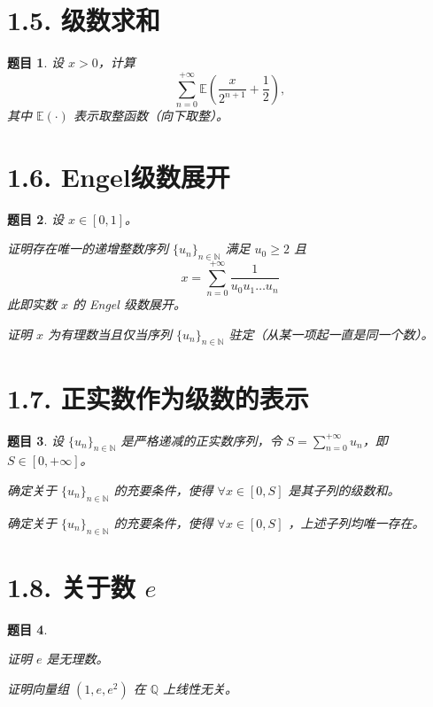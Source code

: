 \documentclass[12pt,UTF8]{ctexbook}
\theoremstyle{exercisestyle}
\newtheorem*{exercise}{题目}
\theoremstyle{solutionstyle}
\begin{document}
\section{1.5. 级数求和}\label{calcul-dune-somme}
\begin{exercise}
设 $x > 0$，计算  
$$
\sum_{n=0}^{+\infty} \mathbb{E}\left(\frac{x}{2^{n+1}} + \frac{1}{2}\right),
$$  
其中 $\mathbb{E}(\cdot)$ 表示取整函数（向下取整）。
\end{exercise}

\section{1.6. Engel级数展开}
\begin{exercise}
设 $x \in [0,1]$。  
\begin{subquestions}
  \item 证明存在唯一的递增整数序列 $\{u_n\}_{n\in\mathbb{N}}$ 满足 $u_0 \geqslant 2$ 且  
  $$
  x = \sum_{n=0}^{+\infty} \frac{1}{u_0 u_1 \dots u_n}
  $$
  此即实数 $x$ 的 Engel 级数展开。  
  \item 证明 $x$ 为有理数当且仅当序列 $\{u_n\}_{n\in\mathbb{N}}$ 驻定（从某一项起一直是同一个数）。
\end{subquestions}
\end{exercise}

\section{1.7. 正实数作为级数的表示}
\begin{exercise}
设 $\{u_n\}_{n\in\mathbb{N}}$ 是严格递减的正实数序列，令 $\displaystyle S = \sum_{n=0}^{+\infty} u_n$，即 $S \in [0, +\infty]$。

\begin{subquestions}
\item 确定关于 $\{u_n\}_{n\in\mathbb{N}}$ 的充要条件，使得 $\forall x \in [0, S]$ 是其子列的级数和。
\item 确定关于 $\{u_n\}_{n\in\mathbb{N}}$ 的充要条件，使得 $\forall x \in [0, S]$ ，上述子列均唯一存在。
\end{subquestions}

\end{exercise}

\section{1.8. 关于数 $e$}
\begin{exercise}
  \begin{subquestions}
    \item 证明 $e$ 是无理数。
    \item 证明向量组 $(1, e, e^2)$ 在 $\mathbb{Q}$ 上线性无关。
  \end{subquestions}
\end{exercise}
\end{document}
